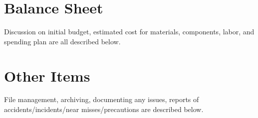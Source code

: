 \documentclass[12pt]{article}
\begin{document}
		\newpage
	
	\section{Balance Sheet}
	Discussion on initial budget, estimated cost for materials, components, labor, and spending plan are all described below.
		
		\newpage				
						
	\section{Other Items}
	File management, archiving, documenting any issues, reports of accidents/incidents/near misses/precautions are described below.
\end{document}
